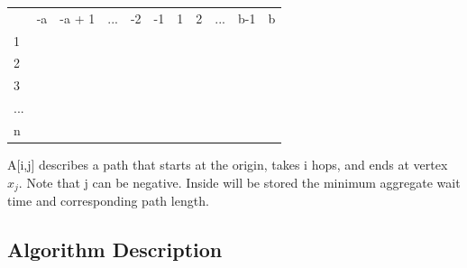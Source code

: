 \documentclass[a4paper]{article}
\begin{document}
\begin{table}[htb]
\centering
\begin{tabular}{lllllllllll}
                         & -a                    & -a + 1                & ...                   & -2                    & -1                    & 1                     & 2                     & ...                   & b-1                   & b                     \\ \cline{2-11} 
\multicolumn{1}{l|}{1}   & \multicolumn{1}{l|}{} & \multicolumn{1}{l|}{} & \multicolumn{1}{l|}{} & \multicolumn{1}{l|}{} & \multicolumn{1}{l|}{} & \multicolumn{1}{l|}{} & \multicolumn{1}{l|}{} & \multicolumn{1}{l|}{} & \multicolumn{1}{l|}{} & \multicolumn{1}{l|}{} \\ \cline{2-11} 
\multicolumn{1}{l|}{2}   & \multicolumn{1}{l|}{} & \multicolumn{1}{l|}{} & \multicolumn{1}{l|}{} & \multicolumn{1}{l|}{} & \multicolumn{1}{l|}{} & \multicolumn{1}{l|}{} & \multicolumn{1}{l|}{} & \multicolumn{1}{l|}{} & \multicolumn{1}{l|}{} & \multicolumn{1}{l|}{} \\ \cline{2-11} 
\multicolumn{1}{l|}{3}   & \multicolumn{1}{l|}{} & \multicolumn{1}{l|}{} & \multicolumn{1}{l|}{} & \multicolumn{1}{l|}{} & \multicolumn{1}{l|}{} & \multicolumn{1}{l|}{} & \multicolumn{1}{l|}{} & \multicolumn{1}{l|}{} & \multicolumn{1}{l|}{} & \multicolumn{1}{l|}{} \\ \cline{2-11} 
\multicolumn{1}{l|}{...} & \multicolumn{1}{l|}{} & \multicolumn{1}{l|}{} & \multicolumn{1}{l|}{} & \multicolumn{1}{l|}{} & \multicolumn{1}{l|}{} & \multicolumn{1}{l|}{} & \multicolumn{1}{l|}{} & \multicolumn{1}{l|}{} & \multicolumn{1}{l|}{} & \multicolumn{1}{l|}{} \\ \cline{2-11} 
\multicolumn{1}{l|}{n}   & \multicolumn{1}{l|}{} & \multicolumn{1}{l|}{} & \multicolumn{1}{l|}{} & \multicolumn{1}{l|}{} & \multicolumn{1}{l|}{} & \multicolumn{1}{l|}{} & \multicolumn{1}{l|}{} & \multicolumn{1}{l|}{} & \multicolumn{1}{l|}{} & \multicolumn{1}{l|}{} \\ \cline{2-11} 
\end{tabular}
\end{table}

A[i,j] describes a path that starts at the origin,  takes i hops, and ends at vertex $x_j$. Note that j can be negative. Inside will be stored the minimum aggregate wait time and corresponding path length.

\subsection{Algorithm Description}
\end{document}
